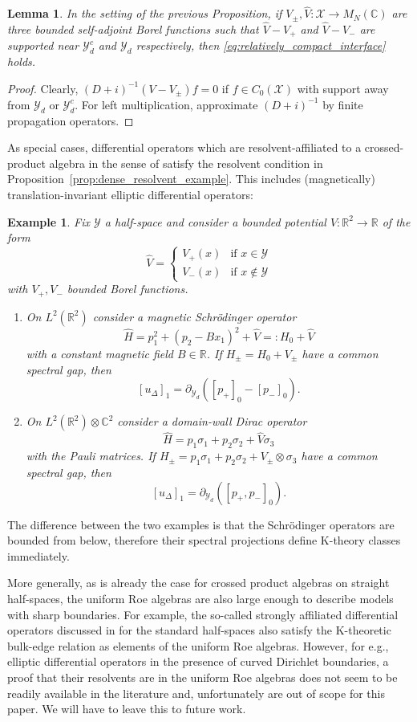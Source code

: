 \documentclass[12pt]{amsart}
\newtheorem{lemma}[theorem]{Lemma}
\newtheorem{example}[theorem]{Example}
\newcommand{\CM}{{\mathbb C}}
\newcommand{\RM}{{\mathbb R}}
\newcommand{\Xx}{{\mathcal X}}
\newcommand{\Yy}{{\mathcal Y}}
\newcommand{\pdv}{\partial}
\begin{document}
\begin{lemma}\label{lem:geometric_support}
In the setting of the previous Proposition, if $V_\pm,\hat{V}:\Xx \to M_N(\CM)$ are three bounded self-adjoint Borel functions such that $\hat{V}-V_+$ and $\hat{V}-V_-$ are supported near $\Yy_d^c$ and $\Yy_d$ respectively, then \eqref{eq:relatively_compact_interface} holds.
\end{lemma}

\begin{proof}
Clearly, $(D+i)^{-1}(V-V_{\pm})f =0$ if $f \in C_0(\Xx)$ with support away from $\Yy_d$ or $\Yy_d^c$.
For left multiplication, approximate $(D+i)^{-1}$ by finite propagation operators.
\end{proof}

As special cases, differential operators which are resolvent-affiliated to a crossed-product algebra in the sense of \cite{KSt} satisfy the resolvent condition in Proposition~\ref{prop:dense_resolvent_example}. This includes (magnetically) translation-invariant elliptic differential operators:
\begin{example}
Fix $\Yy$ a half-space and consider a bounded potential $\hat{V}:\RM^2\to \RM$ of the form $$\hat{V}=\begin{cases}
        V_+(x) & \text{if }x\in \Yy \\
        V_-(x) & \text{if }x\notin \Yy
    \end{cases}$$
    with $V_+, V_-$ bounded Borel functions. 
\begin{enumerate}
    \item[(i)] On $L^2(\RM^2)$ consider a magnetic Schrödinger operator
    $$\hat{H}= p_1^2 + (p_2 - B x_1)^2 + \hat{V} =: H_0 + \hat{V}$$
    with a constant magnetic field $B \in \RM$. If $H_\pm = H_0 + V_\pm$ have a common spectral gap, then 
    $$[u_\Delta]_1 = \pdv_{{\Yy_d}}([p_+]_0 - [p_-]_0).$$
    \item[(ii)] On $L^2(\RM^2)\otimes \CM^2$ consider a domain-wall Dirac operator 
    $$\hat{H}= p_1\sigma_1 + p_2\sigma_2 + \hat{V}\sigma_3$$
    with the Pauli matrices. If $H_\pm = p_1\sigma_1 + p_2\sigma_2  + V_\pm \otimes \sigma_3$ have a common spectral gap, then $$[u_\Delta]_1 = \pdv_{\Yy_d}([p_+,p_-]_0).$$
\end{enumerate}
\end{example}
The difference between the two examples is that the Schrödinger operators are bounded from below, therefore their spectral projections define K-theory classes immediately. 

More generally, as is already the case for crossed product algebras on straight half-spaces, the uniform Roe algebras are also large enough to describe models with sharp boundaries. For example, the so-called strongly affiliated differential operators discussed in \cite{KSt} for the standard half-spaces also satisfy the K-theoretic bulk-edge relation as elements of the uniform Roe algebras. 
However, for e.g., elliptic differential operators in the presence of curved Dirichlet boundaries, a proof that their resolvents are in the uniform Roe algebras does not seem to be readily available in the literature and, unfortunately are out of scope for this paper. We will have to leave this to future work.
\end{document}

